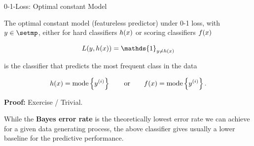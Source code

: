 \begin{vbframe}{0-1-Loss: Optimal constant Model}

The optimal constant model (featureless predictor) under 0-1 loss, with $y \in \setmp$, either for hard classifiers $h(x)$ or scoring classifiers $f(x)$ 

$$
  L(y, \hx) = \mathds{1}_{y \neq \hx}
$$

is the classifier that predicts the most frequent class in the data


$$
h(x) = \text{mode} \left\{y^{(i)}\right\} \qquad \text{or} \qquad f(x) = \text{mode} \left\{y^{(i)}\right\}.
$$

\textbf{Proof:} Exercise / Trivial. 

\lz 

While the \textbf{Bayes error rate} is the theoretically lowest error rate we can achieve for a given data generating process, the above classifier gives usually a lower baseline for the predictive performance. 



\end{vbframe}


\endlecture

